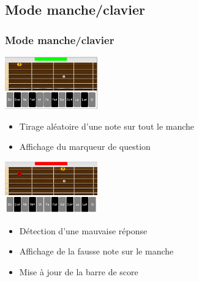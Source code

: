 \documentclass{beamer}
\begin{document}
	\subsection{Mode manche/clavier}
		\begin{frame}
			\frametitle{Mode manche/clavier}

			\begin{minipage}{0.35\linewidth}
				\includegraphics[width=4cm]{images/presentation_mc_question.png}
			\end{minipage}\hfill
			\begin{minipage}{0.6\linewidth}
				
				\begin{itemize}
					\item Tirage aléatoire d'une note sur tout le manche
					\item Affichage du marqueur de question
				\end{itemize}
			\end{minipage}
			\bigbreak

			\begin{minipage}{0.35\linewidth}
				\includegraphics[width=4cm]{images/presentation_mc_bad.png}
			\end{minipage}\hfill
			\begin{minipage}{0.6\linewidth}
				\begin{itemize}
					\item Détection d'une mauvaise réponse
					\item Affichage de la fausse note sur le manche
					\item Mise à jour de la barre de score
				\end{itemize}
			\end{minipage}
			
		\end{frame}	
\end{document}
